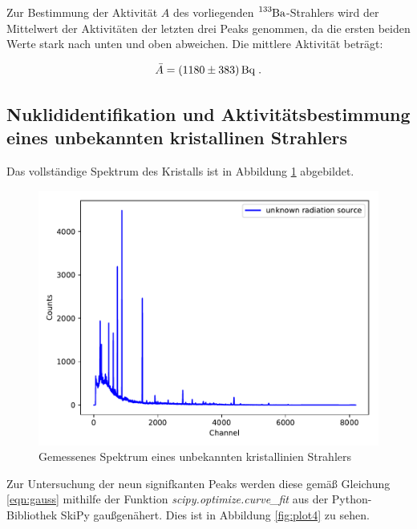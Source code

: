 Zur Bestimmung der Aktivität $A$ des vorliegenden $\ce{^{133}Ba}$-Strahlers wird der Mittelwert der Aktivitäten der letzten drei
Peaks genommen, da die ersten beiden Werte stark nach unten und oben abweichen.
Die mittlere Aktivität beträgt:

\begin{equation*}
  \bar{A} = \SI{1180 +- 383}{\becquerel} \; .
\end{equation*}


\subsection{Nuklididentifikation und Aktivitätsbestimmung eines unbekannten kristallinen Strahlers}

Das vollständige Spektrum des Kristalls ist in Abbildung \ref{fig:plot41} abgebildet.

\begin{figure}
  \centering
  \includegraphics[scale=0.7]{content/plot41.pdf}
  \caption{Gemessenes Spektrum eines unbekannten kristallinien Strahlers}
  \label{fig:plot41}
\end{figure}

Zur Untersuchung der neun signifkanten Peaks werden diese gemäß Gleichung \eqref{eqn:gauss} 
mithilfe der Funktion \textit{scipy.optimize.curve\_fit} aus der Python-Bibliothek SkiPy gaußgenähert.
Dies ist in Abbildung \ref{fig:plot4} zu sehen.

